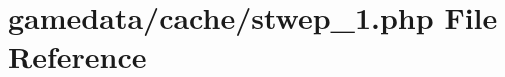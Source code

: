 \hypertarget{stwep__1_8php}{\section{gamedata/cache/stwep\+\_\+1.php File Reference}
\label{stwep__1_8php}
}
